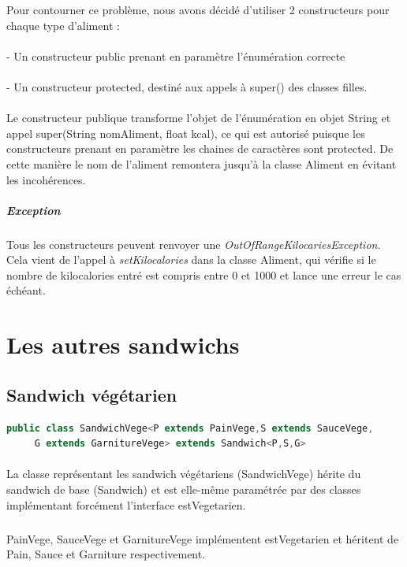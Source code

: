 \documentclass[a4paper]{article}
\begin{document}
Pour contourner ce problème, nous avons décidé d'utiliser 2 constructeurs pour chaque type d'aliment : 

\paragraph{}
- Un constructeur public prenant en paramètre l'énumération correcte
\paragraph{}
- Un constructeur protected, destiné aux appels à super() des classes filles.

\paragraph{}
Le constructeur publique transforme l'objet de l'énumération en objet String et appel super(String nomAliment, float kcal), ce qui est autorisé puisque les constructeurs prenant
en paramètre les chaines de caractères sont protected.
De cette manière le nom de l'aliment remontera jusqu'à la classe Aliment en évitant les incohérences.

\subparagraph{Exception}
Tous les constructeurs peuvent renvoyer une \emph{OutOfRangeKilocariesException}. Cela vient de l'appel à \emph{setKilocalories} dans la classe Aliment, qui vérifie si le nombre de kilocalories entré est
compris entre 0 et 1000 et lance une erreur le cas échéant.

\clearpage
\section{Les autres sandwichs}

\subsection{Sandwich végétarien}
\begin{lstlisting}[language=Java, caption=Entête de la classe SandwichVege]
    public class SandwichVege<P extends PainVege,S extends SauceVege,
     G extends GarnitureVege> extends Sandwich<P,S,G>
\end{lstlisting}
\paragraph{}
La classe représentant les sandwich végétariens (SandwichVege) hérite du sandwich de base (Sandwich) et est elle-même paramétrée par des classes implémentant forcément l'interface estVegetarien.
\subparagraph{}
PainVege, SauceVege et GarnitureVege implémentent estVegetarien et héritent de Pain, Sauce et Garniture respectivement.
\end{document}
